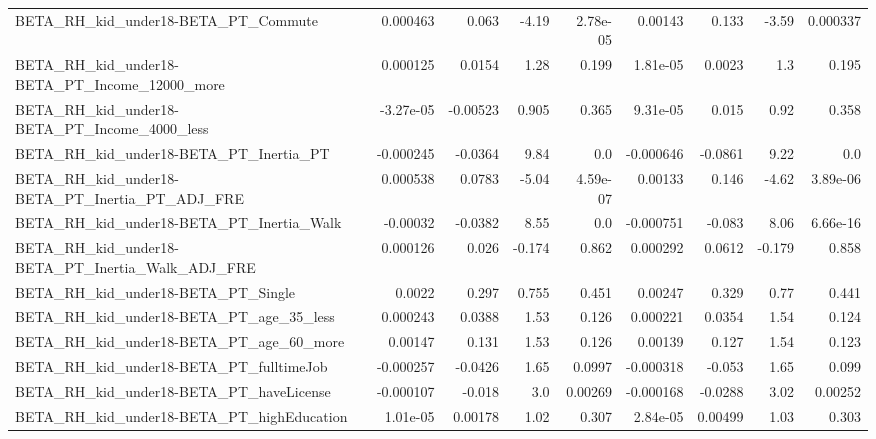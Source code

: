 \begin{tabular}{lrrrrrrrr}
BETA\_RH\_kid\_under18-BETA\_PT\_Commute                &    0.000463 &        0.063 &    -4.19 & 2.78e-05 &    0.00143 &       0.133 &        -3.59 &      0.000337 \\
BETA\_RH\_kid\_under18-BETA\_PT\_Income\_12000\_more      &    0.000125 &       0.0154 &     1.28 &    0.199 &   1.81e-05 &      0.0023 &          1.3 &         0.195 \\
BETA\_RH\_kid\_under18-BETA\_PT\_Income\_4000\_less       &   -3.27e-05 &     -0.00523 &    0.905 &    0.365 &   9.31e-05 &       0.015 &         0.92 &         0.358 \\
BETA\_RH\_kid\_under18-BETA\_PT\_Inertia\_PT             &   -0.000245 &      -0.0364 &     9.84 &      0.0 &  -0.000646 &     -0.0861 &         9.22 &           0.0 \\
BETA\_RH\_kid\_under18-BETA\_PT\_Inertia\_PT\_ADJ\_FRE     &    0.000538 &       0.0783 &    -5.04 & 4.59e-07 &    0.00133 &       0.146 &        -4.62 &      3.89e-06 \\
BETA\_RH\_kid\_under18-BETA\_PT\_Inertia\_Walk           &    -0.00032 &      -0.0382 &     8.55 &      0.0 &  -0.000751 &      -0.083 &         8.06 &      6.66e-16 \\
BETA\_RH\_kid\_under18-BETA\_PT\_Inertia\_Walk\_ADJ\_FRE   &    0.000126 &        0.026 &   -0.174 &    0.862 &   0.000292 &      0.0612 &       -0.179 &         0.858 \\
BETA\_RH\_kid\_under18-BETA\_PT\_Single                 &      0.0022 &        0.297 &    0.755 &    0.451 &    0.00247 &       0.329 &         0.77 &         0.441 \\
BETA\_RH\_kid\_under18-BETA\_PT\_age\_35\_less            &    0.000243 &       0.0388 &     1.53 &    0.126 &   0.000221 &      0.0354 &         1.54 &         0.124 \\
BETA\_RH\_kid\_under18-BETA\_PT\_age\_60\_more            &     0.00147 &        0.131 &     1.53 &    0.126 &    0.00139 &       0.127 &         1.54 &         0.123 \\
BETA\_RH\_kid\_under18-BETA\_PT\_fulltimeJob            &   -0.000257 &      -0.0426 &     1.65 &   0.0997 &  -0.000318 &      -0.053 &         1.65 &         0.099 \\
BETA\_RH\_kid\_under18-BETA\_PT\_haveLicense            &   -0.000107 &       -0.018 &      3.0 &  0.00269 &  -0.000168 &     -0.0288 &         3.02 &       0.00252 \\
BETA\_RH\_kid\_under18-BETA\_PT\_highEducation          &    1.01e-05 &      0.00178 &     1.02 &    0.307 &   2.84e-05 &     0.00499 &         1.03 &         0.303 \\

\end{tabular}
